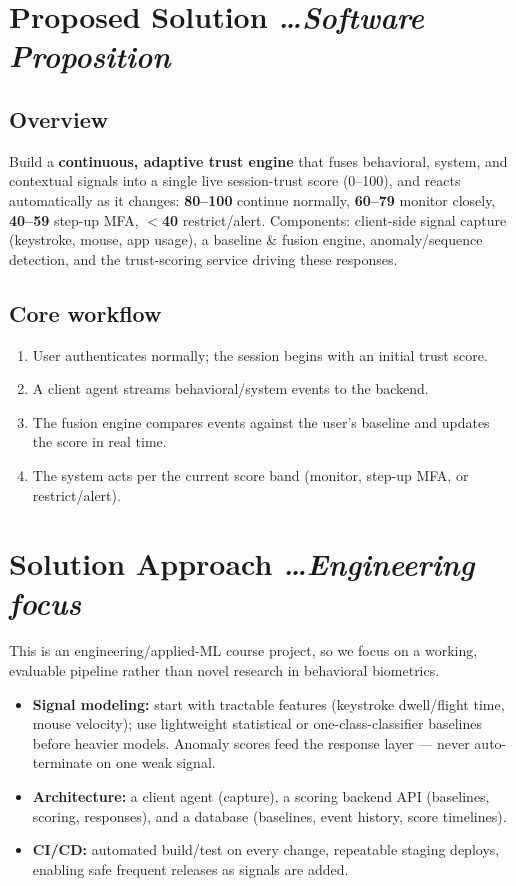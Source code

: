 \documentclass[11pt,a4paper]{article}
\newcommand{\BvrHint}[1]{%
  {\normalfont\normalsize\itshape\hfill #1}}
\begin{document}
\section{Proposed Solution%
\BvrHint{\ldots Software Proposition}} 
\subsection{Overview} 
Build a \textbf{continuous, adaptive trust engine} that fuses 
behavioral, system, and contextual signals into a single live 
session-trust score (0--100), and reacts automatically as it changes: 
\textbf{80--100} continue normally, \textbf{60--79} monitor closely, 
\textbf{40--59} step-up MFA, \textbf{$<$40} restrict/alert. 
Components: client-side signal capture (keystroke, mouse, app usage), 
a baseline \& fusion engine, anomaly/sequence detection, and the 
trust-scoring service driving these responses. 
 
\subsection{Core workflow} 
\begin{enumerate}[leftmargin=0.7cm] 
    \item User authenticates normally; the session begins with an initial trust score. 
    \item A client agent streams behavioral/system events to the backend. 
    \item The fusion engine compares events against the user's baseline and updates the score in real time. 
    \item The system acts per the current score band (monitor, step-up MFA, or restrict/alert). 
\end{enumerate} 
 
\section{Solution Approach%
\BvrHint{\ldots Engineering focus}} 
This is an engineering/applied-ML course project, so we focus on a 
working, evaluable pipeline rather than novel research in behavioral 
biometrics. 
\begin{itemize}[leftmargin=0.7cm] 
    \item \textbf{Signal modeling:} start with tractable features (keystroke dwell/flight time, mouse velocity); use lightweight statistical or one-class-classifier baselines before heavier models. Anomaly scores feed the response layer --- never auto-terminate on one weak signal. 
    \item \textbf{Architecture:} a client agent (capture), a scoring backend API (baselines, scoring, responses), and a database (baselines, event history, score timelines). 
    \item \textbf{CI/CD:} automated build/test on every change, repeatable staging deploys, enabling safe frequent releases as signals are added. 
\end{itemize} 
 
\end{document}
